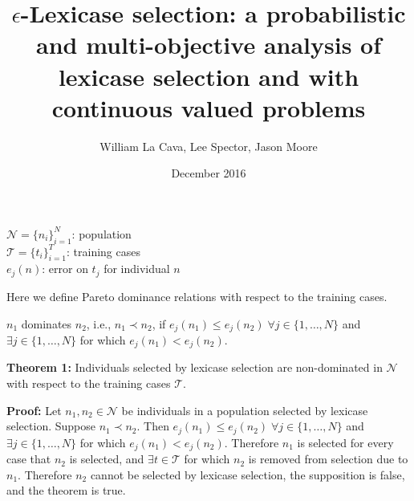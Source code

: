 \documentclass{article}
\title{{\bf \huge $\epsilon$}-Lexicase selection: a probabilistic and multi-objective analysis of lexicase selection and with continuous valued problems}
\author{William La Cava, Lee Spector, Jason Moore}
\date{December 2016}
\begin{document}
\noindent $\mathcal{N} = \{n_i\}_{i=1}^N$: population \\
$\mathcal{T} = \{t_i\}_{i=1}^T$: training cases\\
$e_j(n)$: error on $t_j$ for individual $n$ 


\noindent Here we define Pareto dominance relations with respect to the training cases. 

\medskip
{} $n_1$ dominates $n_2$, i.e., ${n_1} \prec {n_2}$, if $e_j(n_1) \leq e_j(n_2) \;
\forall j  \in \{1,\dots,N\}$ and $\exists j \in \{1,\dots,N\}$ for which $e_j(n_1) < e_j(n_2)$. \bigskip
\bigskip

\noindent \textbf{Theorem 1:} Individuals selected by lexicase selection are non-dominated in $\mathcal{N}$ with respect to the training cases $\mathcal{T}$. 
\medskip

\noindent \textbf{Proof:} Let $n_1, n_2 \in \mathcal{N}$ be individuals in a population selected by lexicase selection. Suppose $n_1 \prec n_2$. Then $e_j(n_1) \leq e_j(n_2) \;
\forall j  \in \{1,\dots,N\}$ and $\exists j \in \{1,\dots,N\}$ for which $e_j(n_1) < e_j(n_2)$. Therefore $n_1$ is selected for every case that $n_2$ is selected, and $\exists t \in \mathcal{T}$ for which $n_2$ is removed from selection due to $n_1$. Therefore $n_2$ cannot be selected by lexicase selection, the supposition is false, and the theorem is true. 
\end{document}
